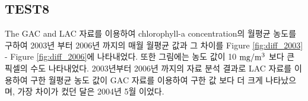 \subsection{TEST8}
 
The GAC and LAC 자료를 이용하여 chlorophyll-a concentration의 월평균 농도를 구하여 2003년 부터 2006년 까지의 매월 월평균 값과 그 차이를 Figure \ref{fig:diff_2003} - Figure \ref{fig:diff_2006}에 나타내었다. 또한 그림에는 농도 값이 10  ${\rm mg/m^3}$ 보다 큰 픽셀의 수도 나타내었다. 2003년부터 2006년 까지의 자료 분석 결과로 LAC 자료를 이용하여 구한 월평균 농도 값이 GAC 자료를 이용하여 구한 값 보다 더 크게 나타났으며, 가장 차이가 컸던 달은 2004년 5월 이었다.
 





